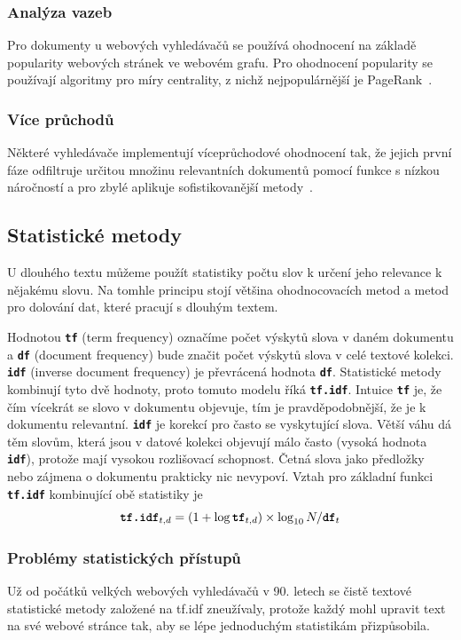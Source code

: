 \documentclass[11pt,letterpaper,oneside,openright]{book}
\newcommand{\bftt}[1]{\texttt{\textbf{#1}}}
\begin{document}

\subsubsection{Analýza vazeb}
Pro dokumenty u webových vyhledávačů se používá ohodnocení na základě
popularity webových stránek ve webovém grafu. Pro ohodnocení popularity se
používají algoritmy pro míry centrality, z nichž nejpopulárnější je
PageRank~\cite{Page99thepagerank}.

\subsubsection{Více průchodů}
Některé vyhledávače implementují víceprůchodové ohodnocení tak, že jejich první
fáze odfiltruje určitou množinu relevantních dokumentů pomocí funkce s nízkou
náročností a pro zbylé aplikuje sofistikovanější
metody~\cite{Yin:2016:RRY:2939672.2939677}.

\subsection{Statistické metody}
U dlouhého textu můžeme použít statistiky počtu slov k určení jeho relevance k
nějakému slovu. Na tomhle principu stojí většina ohodnocovacích metod a metod
pro dolování dat, které pracují s dlouhým textem.

Hodnotou \bftt{tf} (term frequency) označíme počet výskytů slova v daném
dokumentu a \bftt{df} (document frequency) bude značit počet výskytů slova v
celé textové kolekci. \bftt{idf} (inverse document frequency) je převrácená
hodnota \bftt{df}. Statistické metody kombinují tyto dvě hodnoty, proto tomuto
modelu říká \bftt{tf.idf}. Intuice \bftt{tf} je, že čím vícekrát se slovo v
dokumentu objevuje, tím je pravděpodobnější, že je k dokumentu relevantní.
\bftt{idf} je korekcí pro často se vyskytující slova. Větší váhu dá těm slovům,
která jsou v datové kolekci objevují málo často (vysoká hodnota \bftt{idf}),
protože mají vysokou rozlišovací schopnost. Četná slova jako předložky nebo
zájmena o dokumentu prakticky nic nevypoví. Vztah pro základní funkci
\bftt{tf.idf} kombinující obě statistiky je \[\bftt{tf.idf}_{t, d} = (1 + \log
\bftt{tf}_{t, d}) \times \log_{10} N / \bftt{df}_{t}\]

\subsubsection{Problémy statistických přístupů}
Už od počátků velkých webových vyhledávačů v 90. letech se čistě textové
statistické metody založené na tf.idf zneužívaly, protože každý mohl upravit
text na své webové stránce tak, aby se lépe jednoduchým statistikám
přizpůsobila.
\end{document}
